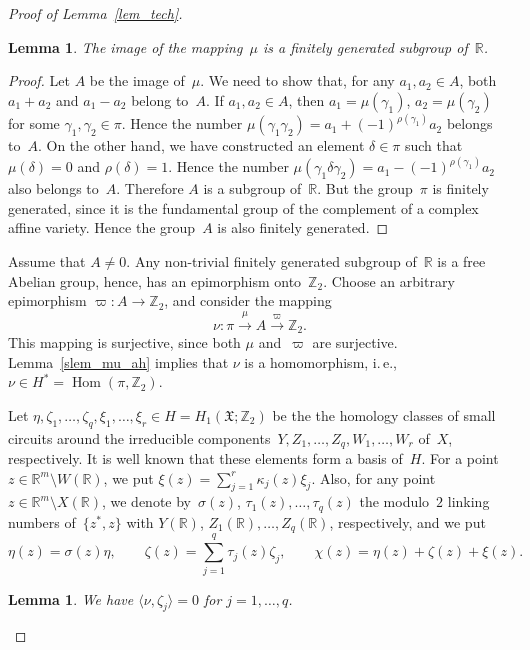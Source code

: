 \documentclass[reqno,tbtags,12pt]{amsart}
\numberwithin{equation}{section}
\newcommand{\R}{\mathbb{R}}
\newcommand{\Z}{\mathbb{Z}}
\newcommand{\FX}{\mathfrak{X}}
\newcommand{\Hom}{\mathop{\mathrm{Hom}}\nolimits}
\newtheorem{lem}[theorem]{Lemma}
\theoremstyle{definition}
\begin{document}
\begin{proof}[Proof of Lemma~\ref{lem_tech}]
\begin{lem}\label{lem_image_mu}
The image of the mapping~$\mu$ is a finitely generated subgroup of\/~$\R$.
\end{lem}

\begin{proof}
Let $A$ be the image of~$\mu$.  We need to show that, for any $a_1,a_2\in A$, both $a_1+a_2$ and $a_1-a_2$  belong to~$A$. If $a_1,a_2\in A$, then $a_1=\mu(\gamma_1)$, $a_2=\mu(\gamma_2)$ for some $\gamma_1,\gamma_2\in\pi$. Hence the number $\mu(\gamma_1\gamma_2)=a_1+(-1)^{\rho(\gamma_1)}a_2$ belongs to~$A$. On the other hand, we have constructed an element $\delta\in \pi$ such that $\mu(\delta)=0$ and $\rho(\delta)=1$. Hence the number $\mu(\gamma_1\delta\gamma_2)=a_1-(-1)^{\rho(\gamma_1)}a_2$ also belongs to~$A$.  Therefore $A$ is a subgroup of~$\R$. But the group~$\pi$ is finitely generated, since it is the fundamental group of the complement of a complex affine variety. Hence the group~$A$ is also finitely generated.
\end{proof}

Assume that $A\ne 0$.  Any non-trivial finitely generated subgroup of~$\R$ is a free Abelian group, hence, has an epimorphism onto~$\Z_2$. Choose an arbitrary epimorphism $\varpi\colon A\to\Z_2$, and consider the mapping
$$
\nu\colon \pi\xrightarrow{\mu}A\xrightarrow{\varpi}\Z_2.
$$
This mapping is surjective, since both $\mu$ and~$\varpi$ are surjective. Lemma~\ref{slem_mu_ah} implies that $\nu$ is a homomorphism, i.\,e., $\nu\in H^*=\Hom(\pi,\Z_2)$. 

Let $\eta,\zeta_1,\ldots,\zeta_q,\xi_1,\ldots,\xi_r\in H=H_1(\FX;\Z_2)$ be the the homology classes of small circuits around the irreducible components~$Y,Z_1,\ldots,Z_q,W_1,\ldots,W_r$ of~$X$, respectively. It is well known that these elements form a basis of~$H$. For a point $z\in \R^m\setminus W(\R)$, we put $\xi(z)=\sum_{j=1}^r\kappa_j(z)\xi_j$. Also, for any point $z\in \R^m\setminus X(\R)$, we denote by~$\sigma(z)$, $\tau_1(z),\ldots,\tau_q(z)$  the modulo~$2$ linking numbers of~$\{z^*,z\}$ with $Y(\R)$, $Z_1(\R),\ldots,Z_q(\R)$, respectively, and we put 
$$\eta(z)=\sigma(z)\eta,\qquad \zeta(z)=\sum_{j=1}^q\tau_j(z)\zeta_j,\qquad 
\chi(z)=\eta(z)+\zeta(z)+\xi(z).$$

\begin{lem}\label{slem_nu_zeta}
We have $\langle\nu,\zeta_j\rangle=0$ for $j=1,\ldots,q$.
\end{lem}


\end{proof}
\end{document}

